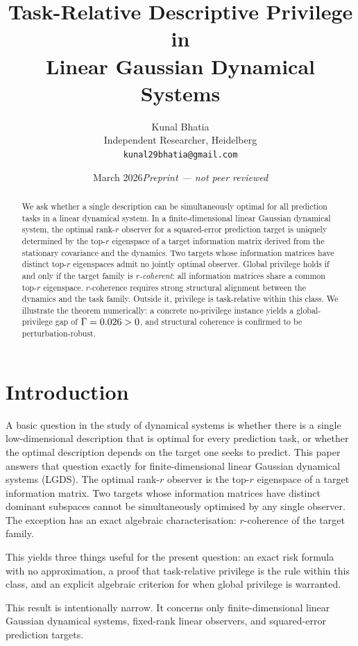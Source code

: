 \documentclass[11pt]{article}
\title{Task-Relative Descriptive Privilege in\\
Linear Gaussian Dynamical Systems}
\author{Kunal Bhatia\\
\small Independent Researcher, Heidelberg\\
\small \texttt{kunal29bhatia@gmail.com}}
\date{March 2026\quad\textit{Preprint --- not peer reviewed}}
\begin{document}
\maketitle

\begin{abstract}
We ask whether a single description can be simultaneously optimal for all
prediction tasks in a linear dynamical system.
In a finite-dimensional linear Gaussian dynamical system, the optimal rank-$r$
observer for a squared-error prediction target is uniquely determined by the
top-$r$ eigenspace of a target information matrix derived from the stationary
covariance and the dynamics.
Two targets whose information matrices have distinct top-$r$ eigenspaces
admit no jointly optimal observer.
Global privilege holds if and only if the target family is \emph{$r$-coherent}:
all information matrices share a common top-$r$ eigenspace.
$r$-coherence requires strong structural alignment between the dynamics and the
task family.
Outside it, privilege is task-relative within this class.
We illustrate the theorem numerically: a concrete no-privilege instance yields a
global-privilege gap of $\Gamma = 0.026 > 0$, and structural coherence
is confirmed to be perturbation-robust.
\end{abstract}

\section{Introduction}

A basic question in the study of dynamical systems is whether there is a
single low-dimensional description that is optimal for every prediction task,
or whether the optimal description depends on the target one seeks to predict.
This paper answers that question exactly for finite-dimensional linear Gaussian
dynamical systems (LGDS).
The optimal rank-$r$ observer is the top-$r$ eigenspace of a target information
matrix.
Two targets whose information matrices have distinct dominant subspaces cannot
be simultaneously optimised by any single observer.
The exception has an exact algebraic characterisation: $r$-coherence of the
target family.

This yields three things useful for the present question:
an exact risk formula with no approximation,
a proof that task-relative privilege is the rule within this class,
and an explicit algebraic criterion for when global privilege is warranted.

This result is intentionally narrow.
It concerns only finite-dimensional linear Gaussian dynamical systems,
fixed-rank linear observers, and squared-error prediction targets.
\end{document}
